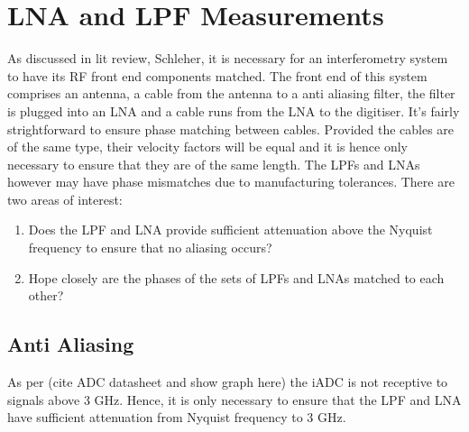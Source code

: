 \chapter{LNA and LPF Measurements}
As discussed in lit review, Schleher, it is necessary for an interferometry system to have its RF front end components matched. The front end of this system comprises an antenna, a cable from the antenna to a anti aliasing filter, the filter is plugged into an LNA and a cable runs from the LNA to the digitiser. 
It's fairly strightforward to ensure phase matching between cables. Provided the cables are of the same type, their velocity factors will be equal and it is hence only necessary to ensure that they are of the same length.
The LPFs and LNAs however may have phase mismatches due to manufacturing tolerances. 
There are two areas of interest:
\begin{enumerate}
  \item Does the LPF and LNA provide sufficient attenuation above the Nyquist frequency to ensure that no aliasing occurs?
  \item Hope closely are the phases of the sets of LPFs and LNAs matched to each other?
\end{enumerate}

\section{Anti Aliasing}
As per (cite ADC datasheet and show graph here) the iADC is not receptive to signals above 3 GHz. Hence, it is only necessary to ensure that the LPF and LNA have sufficient attenuation from Nyquist frequency to 3 GHz. 
